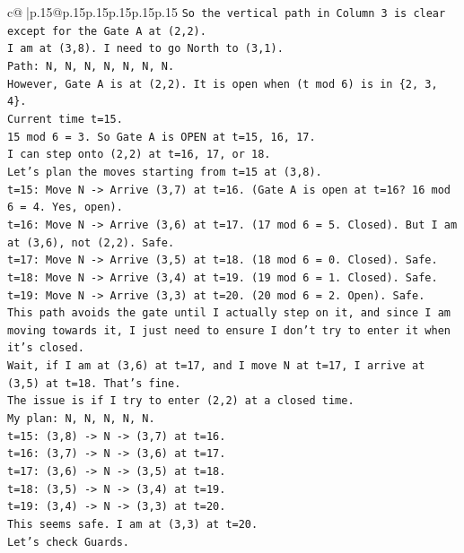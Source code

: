 \documentclass{article}
\begin{document}
{\begin{supertabular}{c@{$\;$}|p{.15\linewidth}@{}p{.15\linewidth}p{.15\linewidth}p{.15\linewidth}p{.15\linewidth}p{.15\linewidth}}
{{{\texttt{So the vertical path in Column 3 is clear except for the Gate A at (2,2).} \\
\texttt{I am at (3,8). I need to go North to (3,1).} \\
\texttt{Path: N, N, N, N, N, N, N.} \\
\texttt{However, Gate A is at (2,2). It is open when (t mod 6) is in \{2, 3, 4\}.} \\
\texttt{Current time t=15.} \\
\texttt{15 mod 6 = 3. So Gate A is OPEN at t=15, 16, 17.} \\
\texttt{I can step onto (2,2) at t=16, 17, or 18.} \\
\texttt{Let's plan the moves starting from t=15 at (3,8).} \\
\texttt{t=15: Move N {-}> Arrive (3,7) at t=16. (Gate A is open at t=16? 16 mod 6 = 4. Yes, open).} \\
\texttt{t=16: Move N {-}> Arrive (3,6) at t=17. (17 mod 6 = 5. Closed). But I am at (3,6), not (2,2). Safe.} \\
\texttt{t=17: Move N {-}> Arrive (3,5) at t=18. (18 mod 6 = 0. Closed). Safe.} \\
\texttt{t=18: Move N {-}> Arrive (3,4) at t=19. (19 mod 6 = 1. Closed). Safe.} \\
\texttt{t=19: Move N {-}> Arrive (3,3) at t=20. (20 mod 6 = 2. Open). Safe.} \\
\texttt{This path avoids the gate until I actually step on it, and since I am moving towards it, I just need to ensure I don't try to enter it when it's closed.} \\
\texttt{Wait, if I am at (3,6) at t=17, and I move N at t=17, I arrive at (3,5) at t=18. That's fine.} \\
\texttt{The issue is if I try to enter (2,2) at a closed time.} \\
\texttt{My plan: N, N, N, N, N.} \\
\texttt{t=15: (3,8) {-}> N {-}> (3,7) at t=16.} \\
\texttt{t=16: (3,7) {-}> N {-}> (3,6) at t=17.} \\
\texttt{t=17: (3,6) {-}> N {-}> (3,5) at t=18.} \\
\texttt{t=18: (3,5) {-}> N {-}> (3,4) at t=19.} \\
\texttt{t=19: (3,4) {-}> N {-}> (3,3) at t=20.} \\
\texttt{This seems safe. I am at (3,3) at t=20.} \\
\texttt{Let's check Guards.} \\
}}}
\end{supertabular}}
\end{document}
